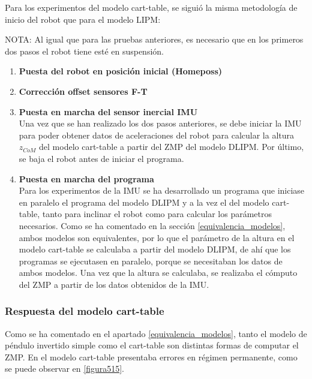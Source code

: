 Para los experimentos del modelo cart-table, se siguió la misma metodología de inicio del robot que para el modelo LIPM:

NOTA: Al igual que para las pruebas anteriores, es necesario que en los primeros dos pasos el robot tiene esté en suspensión.

\begin{enumerate}
\item \textbf{Puesta del robot en posición inicial (Homeposs)}

\item \textbf{Corrección offset sensores F-T} 

\item \textbf{Puesta en marcha del sensor inercial IMU}\\ Una vez que se han realizado los dos pasos anteriores, se debe iniciar la IMU para poder obtener datos de aceleraciones del robot para calcular la altura $z_{CoM}$ del modelo cart-table a partir del ZMP del modelo DLIPM. Por último, se baja el robot antes de iniciar el programa.

\item \textbf{Puesta en marcha del programa}\\ Para los experimentos de la IMU se ha desarrollado un programa que iniciase en paralelo el programa del modelo DLIPM y a la vez el del modelo cart-table, tanto para inclinar el robot como para calcular los parámetros necesarios. Como se ha comentado en la sección \ref{equivalencia_modelos}, ambos modelos son equivalentes, por lo que el parámetro de la altura en el modelo cart-table se calculaba a partir del modelo DLIPM, de ahí que los programas se ejecutasen en paralelo, porque se necesitaban los datos de ambos modelos. Una vez que la altura se calculaba, se realizaba el cómputo del ZMP a partir de los datos obtenidos de la IMU. 

\end{enumerate}

\subsubsection{Respuesta del modelo cart-table}

Como se ha comentado en el apartado \ref{equivalencia_modelos}, tanto el modelo de péndulo invertido simple como el cart-table son distintas formas de computar el ZMP. En \cite{ref22} el modelo cart-table presentaba errores en régimen permanente, como se puede observar en \ref{figura515}.



